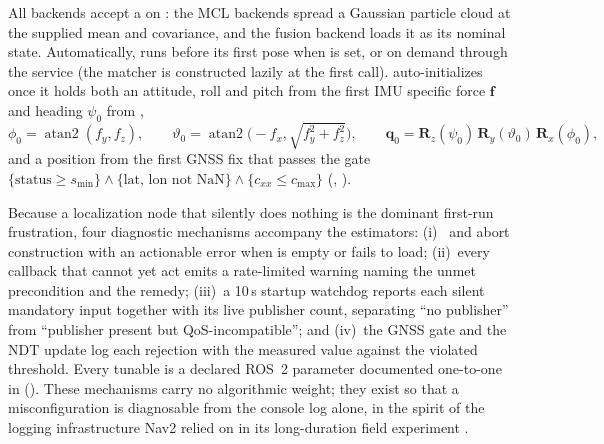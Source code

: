 All backends accept a  on : the MCL backends spread a Gaussian particle cloud at the supplied mean and covariance, and the fusion backend loads it as its nominal state. Automatically,  runs  before its first pose when  is set, or on demand through the  service (the matcher is constructed lazily at the first call).  auto-initializes once it holds both an attitude, roll and pitch from the first IMU specific force $\mathbf{f}$ and heading $\psi_0$ from ,
\begin{equation}\label{eq:attinit}
  \phi_0=\operatorname{atan2}(f_y,f_z),\qquad
  \vartheta_0=\operatorname{atan2}\!\big(-f_x,\sqrt{f_y^2+f_z^2}\big),\qquad
  \mathbf{q}_0=\mathbf{R}_z(\psi_0)\,\mathbf{R}_y(\vartheta_0)\,\mathbf{R}_x(\phi_0),
\end{equation}
and a position from the first GNSS fix that passes the gate $\{\text{status}\ge s_{\min}\}\wedge\{\text{lat, lon not NaN}\}\wedge\{c_{xx}\le c_{\max}\}$ (, ).

Because a localization node that silently does nothing is the dominant first-run frustration, four diagnostic mechanisms accompany the estimators: (i)~ and  abort construction with an actionable error when  is empty or fails to load; (ii)~every callback that cannot yet act emits a rate-limited warning naming the unmet precondition and the remedy; (iii)~a 10\,s startup watchdog reports each silent mandatory input together with its live publisher count, separating ``no publisher'' from ``publisher present but QoS-incompatible''; and (iv)~the GNSS gate and the NDT update log each rejection with the measured value against the violated threshold. Every tunable is a declared ROS~2 parameter documented one-to-one in  (). These mechanisms carry no algorithmic weight; they exist so that a misconfiguration is diagnosable from the console log alone, in the spirit of the logging infrastructure Nav2 relied on in its long-duration field experiment \citep{macenski2020marathon}.
